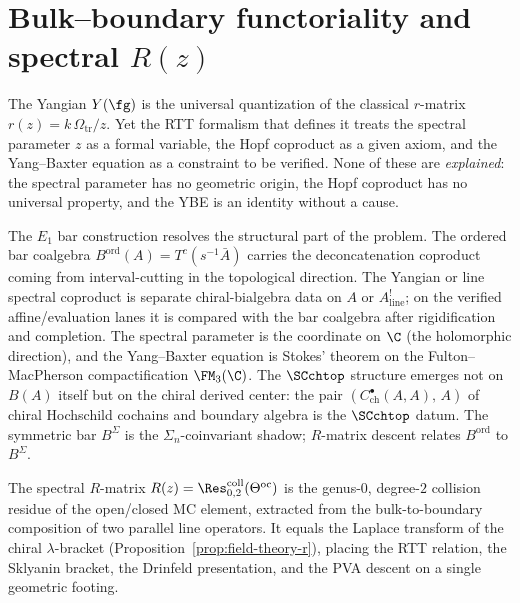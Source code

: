 \providecommand{\HH}{\operatorname{HH}}
\providecommand{\Har}{\operatorname{Har}}

\section{Bulk--boundary functoriality and spectral $R(z)$}
\label{sec:bulk-boundary-R}
\label{sec:spectral_braiding}
\label{sec:spectral-braiding}
\label{chap:spectral-braiding}
\label{sec:bulk-boundary}

The Yangian $Y(\fg)$ is the universal quantization of the classical $r$-matrix $r(z) = k\,\Omega_{\mathrm{tr}}/z$. Yet the RTT formalism that defines it treats the spectral parameter $z$ as a formal variable, the Hopf coproduct as a given axiom, and the Yang--Baxter equation as a constraint to be verified. None of these are \emph{explained}: the spectral parameter has no geometric origin, the Hopf coproduct has no universal property, and the YBE is an identity without a cause.

The $E_1$ bar construction resolves the structural part of the
problem. The ordered bar coalgebra
$B^{\mathrm{ord}}(A)=T^c(s^{-1}\bar A)$ carries the deconcatenation
coproduct coming from interval-cutting in the topological direction.
The Yangian or line spectral coproduct is separate chiral-bialgebra
data on \(A\) or \(A^!_{\mathrm{line}}\); on the verified
affine/evaluation lanes it is compared with the bar coalgebra after
rigidification and completion. The spectral parameter is the
coordinate on $\C$ (the holomorphic direction), and the
Yang--Baxter equation is Stokes' theorem on the Fulton--MacPherson
compactification $\FM_3(\C)$. The $\SCchtop$ structure emerges not on
$B(A)$ itself but on the chiral derived center: the pair
$(C^\bullet_{\mathrm{ch}}(A,A),\, A)$ of chiral Hochschild cochains
and boundary algebra is the $\SCchtop$ datum. The symmetric bar
$B^\Sigma$ is the $\Sigma_n$-coinvariant shadow; $R$-matrix descent
relates $B^{\mathrm{ord}}$ to $B^\Sigma$.

The spectral $R$-matrix $R(z) = \Res^{\mathrm{coll}}_{0,2}(\Theta^{\mathrm{oc}})$ is the genus-$0$, degree-$2$ collision residue of the open/closed MC element, extracted from the bulk-to-boundary composition of two parallel line operators. It equals the Laplace transform of the chiral $\lambda$-bracket (Proposition~\ref{prop:field-theory-r}), placing the RTT relation, the Sklyanin bracket, the Drinfeld presentation, and the PVA descent on a single geometric footing.

